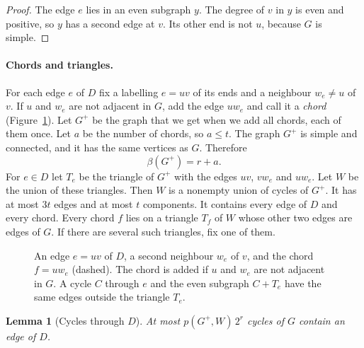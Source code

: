 \documentclass[11pt]{article}
\newtheorem{lemma}[theorem]{Lemma}
\theoremstyle{definition}
\theoremstyle{remark}
\begin{document}
\begin{proof}
The edge $e$ lies in an even subgraph $y$. The degree of $v$ in $y$ is even and positive, so $y$ has
a second edge at $v$. Its other end is not $u$, because $G$ is simple.
\end{proof}

\paragraph{Chords and triangles.}
For each edge $e$ of $D$ fix a labelling $e=uv$ of its ends and a neighbour $w_e\ne u$ of $v$. If
$u$ and $w_e$ are not adjacent in $G$, add the edge $uw_e$ and call it a \emph{chord}
(Figure~\ref{fig:chord}). Let $G^{+}$ be the graph that we get when we add all chords, each of them
once. Let $a$ be the number of chords, so $a\le t$. The graph $G^{+}$ is simple and connected, and
it has the same vertices as $G$. Therefore
\[
  \beta(G^{+})=r+a .
\]
For $e\in D$ let $T_e$ be the triangle of $G^{+}$ with the edges $uv$, $vw_e$ and $uw_e$. Let $W$ be
the union of these triangles. Then $W$ is a nonempty union of cycles of $G^{+}$. It has at most $3t$
edges and at most $t$ components. It contains every edge of $D$ and every chord. Every chord $f$
lies on a triangle $T_f$ of $W$ whose other two edges are edges of $G$. If there are several such
triangles, fix one of them.

\begin{figure}[ht]
\centering
{}
\caption{An edge $e=uv$ of $D$, a second neighbour $w_e$ of $v$, and the chord $f=uw_e$ (dashed).
The chord is added if $u$ and $w_e$ are not adjacent in $G$. A cycle $C$ through $e$ and the even
subgraph $C+T_e$ have the same edges outside the triangle $T_e$.}
\label{fig:chord}
\end{figure}

\begin{lemma}[Cycles through $D$]\label{lem:through}
At most $p(G^{+},W)\,2^{r}$ cycles of $G$ contain an edge of $D$.
\end{lemma}
\end{document}
